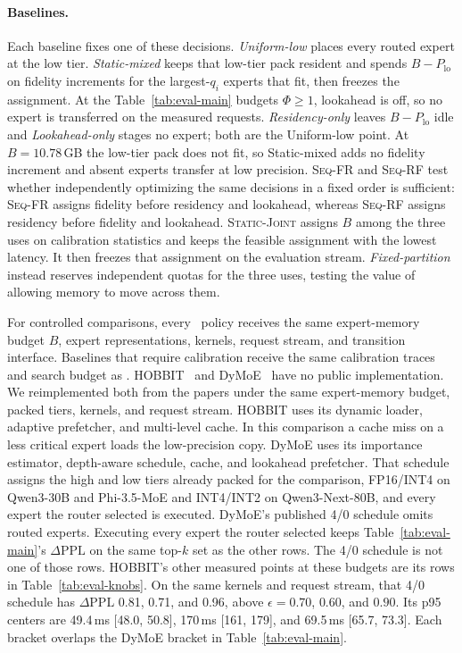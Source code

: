 \paragraph{Baselines.}
Each baseline fixes one of these decisions. \emph{Uniform-low} places every routed expert at the low tier. \emph{Static-mixed} keeps that low-tier pack resident and spends \(B-P_{\mathrm{lo}}\) on fidelity increments for the largest-\(q_i\) experts that fit, then freezes the assignment. At the Table~\ref{tab:eval-main} budgets \(\Phi\ge 1\), lookahead is off, so no expert is transferred on the measured requests. \emph{Residency-only} leaves \(B-P_{\mathrm{lo}}\) idle and \emph{Lookahead-only} stages no expert; both are the Uniform-low point. At \(B=10.78\)\,GB the low-tier pack does not fit, so Static-mixed adds no fidelity increment and absent experts transfer at low precision. \textsc{Seq-FR} and \textsc{Seq-RF} test whether independently optimizing the same decisions in a fixed order is sufficient: \textsc{Seq-FR} assigns fidelity before residency and lookahead, whereas \textsc{Seq-RF} assigns residency before fidelity and lookahead. \textsc{Static-Joint} assigns \(B\) among the three uses on calibration statistics and keeps the feasible assignment with the lowest latency. It then freezes that assignment on the evaluation stream. \emph{Fixed-partition} instead reserves independent quotas for the three uses, testing the value of allowing memory to move across them.

For controlled comparisons, every \systemname\ policy receives the same expert-memory budget \(B\), expert representations, kernels, request stream, and transition interface. Baselines that require calibration receive the same calibration traces and search budget as \systemname. HOBBIT~\cite{tang2024hobbit} and DyMoE~\cite{huang2026dymoe} have no public implementation. We reimplemented both from the papers under the same expert-memory budget, packed tiers, kernels, and request stream. HOBBIT uses its dynamic loader, adaptive prefetcher, and multi-level cache. In this comparison a cache miss on a less critical expert loads the low-precision copy. DyMoE uses its importance estimator, depth-aware schedule, cache, and lookahead prefetcher. That schedule assigns the high and low tiers already packed for the comparison, FP16/INT4 on Qwen3-30B and Phi-3.5-MoE and INT4/INT2 on Qwen3-Next-80B, and every expert the router selected is executed. DyMoE's published 4/0 schedule omits routed experts. Executing every expert the router selected keeps Table~\ref{tab:eval-main}'s \(\Delta\mathrm{PPL}\) on the same top-\(k\) set as the other rows. The 4/0 schedule is not one of those rows. HOBBIT's other measured points at these budgets are its rows in Table~\ref{tab:eval-knobs}. On the same kernels and request stream, that 4/0 schedule has \(\Delta\mathrm{PPL}\) 0.81, 0.71, and 0.96, above \(\epsilon=0.70\), \(0.60\), and \(0.90\). Its p95 centers are 49.4\,ms [48.0, 50.8], 170\,ms [161, 179], and 69.5\,ms [65.7, 73.3]. Each bracket overlaps the DyMoE bracket in Table~\ref{tab:eval-main}.

